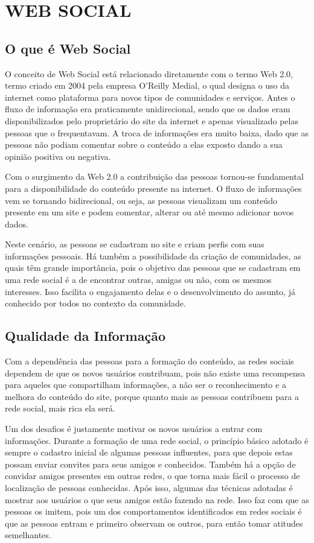 \chapter{WEB SOCIAL} %
\label{cha:web_social}

\section{O que é Web Social}

O conceito de Web Social está relacionado diretamente com o termo Web 2.0, termo criado em 2004 pela empresa O'Reilly Medial, o qual designa o uso da internet como plataforma para novos tipos de comunidades e serviços. Antes o fluxo de informação era praticamente unidirecional, sendo que os dados eram disponibilizados pelo proprietário do site da internet e apenas visualizado pelas pessoas que o frequentavam. A troca de informações era muito baixa, dado que as pessoas não podiam comentar sobre o conteúdo a elas exposto dando a sua opinião positiva ou negativa.

Com o surgimento da Web 2.0 a contribuição das pessoas tornou-se fundamental para a disponibilidade do conteúdo presente na internet. O fluxo de informações vem se tornando bidirecional, ou seja, as pessoas visualizam um conteúdo presente em um site e podem comentar, alterar ou até mesmo adicionar novos dados.

Neste cenário, as pessoas se cadastram no site e criam perfis com suas informações pessoais. Há também a possibilidade da criação de comunidades, as quais têm grande importância, pois o objetivo das pessoas que se cadastram em uma rede social é a de encontrar outras, amigas ou não, com os mesmos interesses. Isso facilita o engajamento delas e o desenvolvimento do assunto, já conhecido por todos no contexto da comunidade.

\section{Qualidade da Informação}

Com a dependência das pessoas para a formação do conteúdo, as redes sociais dependem de que os novos usuários contribuam, pois não existe uma recompensa para aqueles que compartilham informações, a não ser o reconhecimento e a melhora do conteúdo do site, porque quanto mais as pessoas contribuem para a rede social, mais rica ela será.

Um dos desafios é justamente motivar os novos usuários a entrar com informações. Durante a formação de uma rede social, o princípio básico adotado é sempre o cadastro inicial de algumas pessoas influentes, para que depois estas possam enviar convites para seus amigos e conhecidos. Também há a opção de convidar amigos presentes em outras redes, o que torna mais fácil o processo de localização de pessoas conhecidas. Após isso, algumas das técnicas adotadas é mostrar aos usuários o que seus amigos estão fazendo na rede. Isso faz com que as pessoas os imitem, pois um dos comportamentos identificados em redes sociais é que as pessoas entram e primeiro observam os outros, para então tomar atitudes semelhantes.

